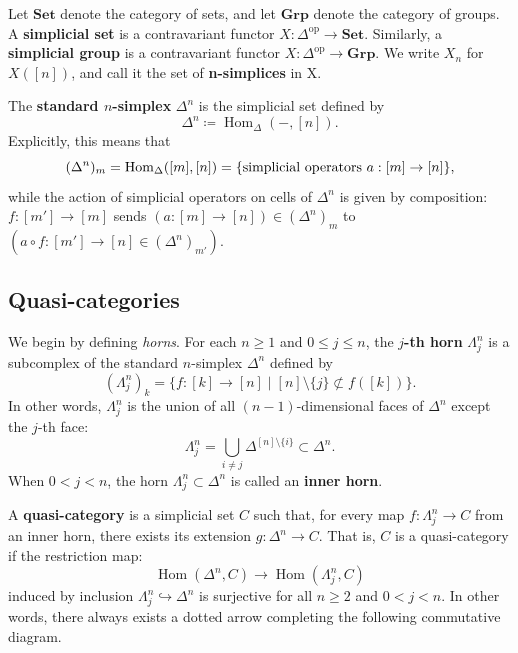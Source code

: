 \documentclass{tac}
\renewcommand{\to}{\rightarrow}
\begin{document}
Let $\mathbf{Set}$ denote the category of sets, and let $\mathbf{Grp}$ denote the category of groups.  
A \textbf{simplicial set} is a contravariant functor $X : \Delta^{\mathrm{op}} \to \mathbf{Set}$. Similarly, a \textbf{simplicial group} is a contravariant functor $X : \Delta^{\mathrm{op}} \to \mathbf{Grp}$. We write $X_n$ for $X([n])$, and call it the set of \textbf{n-simplices} in X.

The \textbf{standard $n$-simplex} $\Delta^n$ is the simplicial set defined by
\[
\Delta^n \coloneqq \operatorname{Hom}_\Delta(-, [n]).
\]
Explicitly, this means that 
\[
(\Delta^n)_m = {\rm Hom}_\Delta ([m], [n]) = \{ \text{simplicial operators } a:[m] \rightarrow [n]  \},
\]
while the action of simplicial operators on cells of $\Delta^n$ is given by composition: $f: [m'] \rightarrow [m]$ sends $(a: [m] \rightarrow [n])\in (\Delta^n)_m $ to $(a \circ f : [m'] \rightarrow [n] \in (\Delta^n)_{m'})$.


\subsection{Quasi-categories}

We begin by defining \emph{horns}. For each $n \ge 1$ and $0 \le j \le n$, the \textbf{$j$-th horn} $\Lambda^n_j$ is a subcomplex of the standard $n$-simplex $\Delta^n$ defined by
\[
(\Lambda^n_j)_k = \{ f : [k] \to [n] \mid [n] \setminus \{ j \} \not\subset f([k]) \}.
\]
In other words, $\Lambda^n_j$ is the union of all $(n-1)$-dimensional faces of $\Delta^n$ except the $j$-th face:
\[
\Lambda^n_j = \bigcup_{i \neq j} \Delta^{[n] \setminus \{i\}} \subset \Delta^n.
\]
When $0 < j < n$, the horn $\Lambda^n_j \subset \Delta^n$ is called an \textbf{inner horn}.

A \textbf{quasi-category} is a simplicial set $C$ such that, for every map $f : \Lambda^n_j \to C$ from an inner horn, there exists its extension $g : \Delta^n \to C$. That is, $C$ is a quasi-category if the restriction map:
\[
\operatorname{Hom}(\Delta^n, C) \to \operatorname{Hom}(\Lambda^n_j, C)
\]
induced by inclusion $\Lambda^n_j \hookrightarrow \Delta^n$ is surjective for all $n \ge 2$ and $0 < j < n$. In other words, there always exists a dotted arrow completing the following commutative diagram.



\begin{center}
\end{center}
\end{document}
